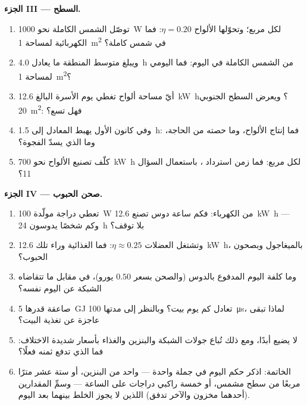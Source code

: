 \begin{problem}
\medskip
\noindent\textbf{الجزء III --- السطح.}
\begin{enumerate}[resume]
  \item توصّل الشمس الكاملة نحو \qty{1000}{W} لكل 
        مربع؛ وتحوّلها الألواح  $\eta = 0.20$: فما 
        الكهربائية لمساحة \qty{1}{m^2} في شمس كاملة؟
  \item ويبلغ متوسط المنطقة ما يعادل \qty{4.0}{h} من الشمس
        الكاملة في اليوم: فما  اليومي لمساحة \qty{1}{m^2}؟
  \item أيّ مساحة ألواح تغطي يوم الأسرة البالغ \qty{12.6}{kW.h}؟
        ويعرض السطح الجنوبي \qty{20}{m^2}: فهل تسع؟
  \item وفي كانون الأول يهبط المعادل إلى \qty{1.5}{h}: فما إنتاج
        الألواح، وما حصته من الحاجة، وما الذي يسدّ
        الفجوة؟
  \item كلّف تصنيع الألواح نحو \qty{700}{kW.h} لكل 
        مربع: فما زمن استرداد ، باستعمال السؤال 11؟
\end{enumerate}

\medskip
\noindent\textbf{الجزء IV --- صحن الحبوب.}
\begin{enumerate}[resume]
  \item تعطي دراجة مولّدة \qty{100}{W} من الكهرباء:
        فكم ساعة دوس تصنع \qty{12.6}{kW.h} --- وكم شخصًا
        يدوسون \qty{24}{h} بلا توقف؟
  \item وتشتغل العضلات  $\eta \approx 0.25$: فما  الغذائية وراء
        تلك \qty{12.6}{kW.h}، بالميغاجول وبصحون الحبوب؟
  \item وما كلفة اليوم المدفوع بالدوس (والصحن بسعر $0.50$ يورو)، في مقابل
        ما تتقاضاه الشبكة عن اليوم نفسه؟
  \item صاعقة قدرها \qty{5}{GJ} تعادل كم يوم بيت؟
        وبالنظر إلى مدتها \qty{100}{\micro s}، لماذا تبقى عاجزة
        عن تغذية البيت؟
  \item {} لا يضيع أبدًا، ومع ذلك تُباع جولات الشبكة والبنزين
        والغذاء بأسعار شديدة الاختلاف: فما الذي تدفع ثمنه فعلًا؟
  \item الخاتمة: اذكر حكم اليوم في جملة واحدة --- 
        واحد من البنزين، أو ستة عشر مترًا مربعًا من سطح مشمس، أو
        خمسة راكبي دراجات على  الساعة --- وسمِّ المقدارين
        (أحدهما مخزون والآخر تدفق) اللذين لا يجوز الخلط بينهما بعد اليوم.
\end{enumerate}
\end{problem}
